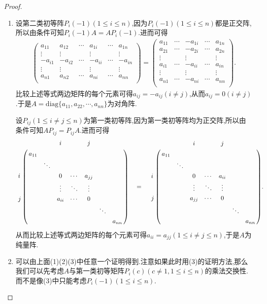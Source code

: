 \documentclass[lang=cn,newtx,10pt,scheme=chinese]{elegantbook}
\begin{document}
\begin{proof}
\begin{enumerate}
\item 设第二类初等阵\(P_{i}(-1)(1\leq i\leq n)\),因为$P_{i}(-1)(1\leq i\leq n)$都是正交阵,所以由条件可知$P_{i}(-1)A=AP_{i}(-1)$.进而可得
\begin{align*}
\left( \begin{matrix}
a_{11}&		a_{12}&		\cdots&		a_{1i}&		\cdots&		a_{1n}\\
\vdots&		\vdots&		&		\vdots&		&		\vdots\\
-a_{i1}&		-a_{i2}&		\cdots&		-a_{ii}&		\cdots&		-a_{in}\\
\vdots&		\vdots&		&		\vdots&		&		\vdots\\
a_{n1}&		a_{n2}&		\cdots&		a_{ni}&		\cdots&		a_{nn}\\
\end{matrix} \right) =\left( \begin{matrix}
a_{11}&		\cdots&		-a_{1i}&		\cdots&		a_{1n}\\
a_{21}&		\cdots&		-a_{2i}&		\cdots&		a_{2n}\\
\vdots&		&		\vdots&		&		\vdots\\
a_{i1}&		\cdots&		-a_{ii}&		\cdots&		a_{in}\\
\vdots&		&		\vdots&		&		\vdots\\
a_{n1}&		\cdots&		-a_{ni}&		\cdots&		a_{nn}\\
\end{matrix} \right) .
\end{align*}
比较上述等式两边矩阵的每个元素可得$a_{ij}=-a_{ij}\left( i\ne j \right) $,从而$a_{ij}=0\left( i\ne j \right) $.于是\(A=\text{diag}\{a_{11},a_{22},\cdots,a_{nn}\}\)为对角阵.

设\(P_{ij}(1\leq i\neq j\leq n)\)为第一类初等阵,因为第一类初等阵均为正交阵,所以由条件可知\(AP_{ij}=P_{ij}A\).进而可得
\begin{align*}
\bordermatrix{%
&    &		&		i&		&		j&		&		\cr
&    a_{11}&		&		&		&		&		&		\cr
&    &		\ddots&		&		&		&		&		\cr
i&    &		&		0&		\cdots&		a_{jj}&		&		\cr
&   &		&		\vdots&		\ddots&		\vdots&		&		\cr
j&    &		&		a_{ii}&		\cdots&		0&		&		\cr
&    &		&		&		&		&		\ddots&		\cr
&    &		&		&		&		&		&		a_{nn}\cr
} \quad =\quad \bordermatrix{%
&    &		&		i&		&		j&		&		\cr
&    a_{11}&		&		&		&		&		&		\cr
&    &		\ddots&		&		&		&		&		\cr
i&    &		&		0&		\cdots&		a_{ii}&		&		\cr
&    &		&		\vdots&		\ddots&		\vdots&		&		\cr
j&   &		&		a_{jj}&		\cdots&		0&		&		\cr
&    &		&		&		&		&		\ddots&		\cr
&    &		&		&		&		&		&		a_{nn}\cr
} .
\end{align*}
从而比较上述等式两边矩阵的每个元素可得\(a_{ii}=a_{jj}(1\leq i\neq j\leq n)\),于是\(A\)为纯量阵.

\item 可以由上面(1)(2)(3)中任意一个证明得到.注意如果此时用(3)的证明方法,那么我们可以先考虑$A$与第一类初等矩阵\(P_{i}(c)(c\ne 1,1\leq i\leq n)\)的乘法交换性.而不是像(3)中只能考虑\(P_{i}(-1)(1\leq i\leq n)\).
\end{enumerate}
\end{proof}
\end{document}

